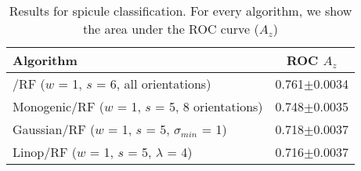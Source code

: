 \begin{table}
\caption{Results for spicule classification. For every algorithm, we show the area under the ROC curve ($A_z$)}
\label{t:spicule_classification}
%
\begin{tabular}{l c}
Algorithm
		& ROC $A_z$ \\
\hline
\dtcwt{}/RF ($w$ = 1, $s$ = 6, all orientations)
		& 0.761$\pm$0.0034 \\
Monogenic/RF ($w$ = 1, $s$ = 5, 8 orientations)
		& 0.748$\pm$0.0035 \\
Gaussian/RF ($w$ = 1, $s$ = 5, $\sigma_{min}$ = 1)
		& 0.718$\pm$0.0037 \\
Linop/RF ($w$ = 1, $s$ = 5, $\lambda$ = 4)
		& 0.716$\pm$0.0037 \\
\end{tabular}
\end{table}

